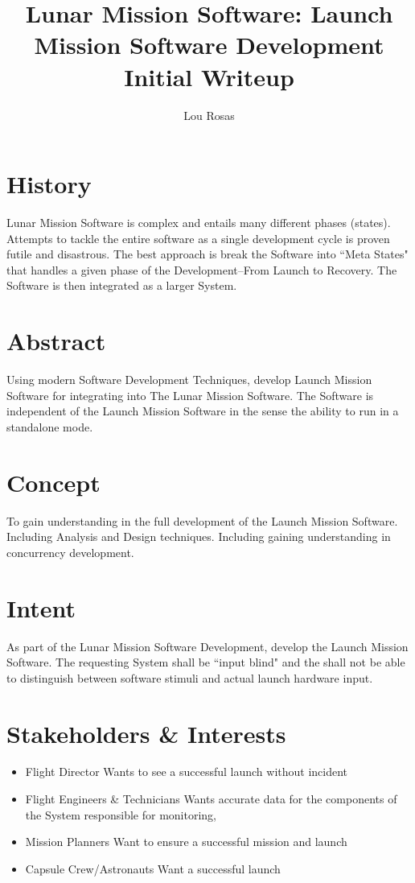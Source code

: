 \documentclass[letterpaper]{article}
\begin{document}
\title{Lunar Mission Software: Launch Mission Software Development
Initial Writeup}
\author{Lou Rosas}
\maketitle
\section{History}
Lunar Mission Software is complex and entails many different phases
(states).  Attempts to tackle the entire software as a single 
development cycle is proven futile and disastrous.  The best 
approach is break the Software into ``Meta States" that handles a 
given phase of the Development--From Launch to Recovery.  The Software
is then integrated as a larger System.

\section{Abstract}
Using modern Software Development Techniques, develop Launch Mission 
Software for integrating into The Lunar Mission Software.  The 
Software is independent of the Launch Mission Software in the sense 
the ability to run in a standalone mode.

\section{Concept}
To gain understanding in the full development of the Launch Mission
Software.  Including Analysis and Design techniques.  Including 
gaining understanding in concurrency development.

\section{Intent}
As part of the Lunar Mission Software Development, develop the Launch
Mission Software.  The requesting System shall be ``input blind" and
the shall not be able to distinguish between software stimuli and 
actual launch hardware input.

\section{Stakeholders \& Interests}
\begin{itemize}
   \item Flight Director Wants to see a successful launch without
      incident
   \item Flight Engineers \& Technicians Wants accurate data for the
      components of the System responsible for monitoring,
   \item Mission Planners Want to ensure a successful mission and
      launch
   \item Capsule Crew/Astronauts Want a successful launch
\end{itemize}
\end{document}
